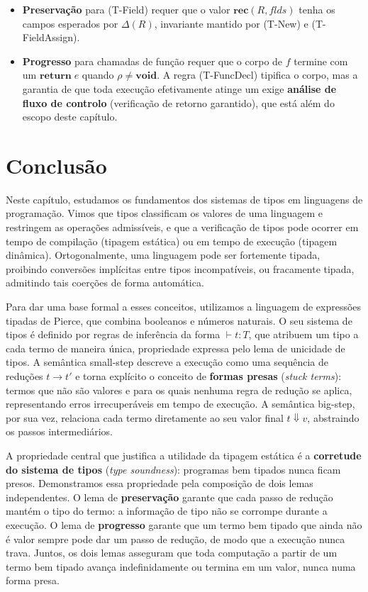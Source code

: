\begin{itemize}
  \item \textbf{Preservação} para (T-Field) requer que o valor
    \(\mathbf{rec}(R, \mathit{flds})\) tenha os campos esperados por
    \(\Delta(R)\), invariante mantido por (T-New) e (T-FieldAssign).
  \item \textbf{Progresso} para chamadas de função requer que o corpo
    de \(f\) termine com um \(\mathbf{return}\; e\) quando \(\rho \neq
    \mathbf{void}\). A regra (T-FuncDecl) tipifica o corpo, mas a
    garantia de que toda execução efetivamente atinge um
     exige \textbf{análise de fluxo de controlo}
    (verificação de retorno garantido), que está além do escopo deste
    capítulo.
\end{itemize}

\section{Conclusão}

Neste capítulo, estudamos os fundamentos dos sistemas de tipos em
linguagens de programação. Vimos que tipos classificam os valores de
uma linguagem e restringem as operações admissíveis, e que a
verificação de tipos pode ocorrer em tempo de compilação (tipagem
estática) ou em tempo de execução (tipagem dinâmica).
Ortogonalmente, uma linguagem pode ser fortemente tipada, proibindo
conversões implícitas entre tipos incompatíveis, ou fracamente
tipada, admitindo tais coerções de forma automática.

Para dar uma base formal a esses conceitos, utilizamos a linguagem de
expressões tipadas de Pierce, que combina booleanos e números
naturais. O seu sistema de tipos é definido por regras de inferência
da forma \(\vdash t : T\), que atribuem um tipo a cada termo de
maneira única, propriedade expressa pelo lema de unicidade de
tipos. A semântica small-step descreve a execução como uma sequência
de reduções \(t \to t'\) e torna explícito o conceito de
\textbf{formas presas} (\emph{stuck terms}): termos que não são
valores e para os quais nenhuma regra de redução se aplica,
representando erros irrecuperáveis em tempo de execução. A semântica
big-step, por sua vez, relaciona cada termo diretamente ao seu valor
final \(t \Downarrow v\), abstraindo os passos intermediários.

A propriedade central que justifica a utilidade da tipagem estática é
a \textbf{corretude do sistema de tipos} (\emph{type soundness}):
programas bem tipados nunca ficam presos. Demonstramos essa
propriedade pela composição de dois lemas independentes. O lema de
\textbf{preservação} garante que cada passo de redução mantém o tipo
do termo: a informação de tipo não se corrompe durante a execução.
O lema de \textbf{progresso} garante que um termo bem tipado que
ainda não é valor sempre pode dar um passo de redução, de modo que a execução
nunca trava. Juntos, os dois lemas asseguram que toda computação a
partir de um termo bem tipado avança indefinidamente ou termina em um
valor, nunca numa forma presa.

